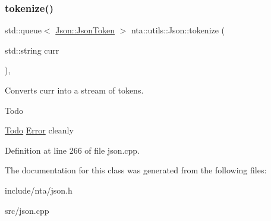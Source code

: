 \subsubsection{\texorpdfstring{tokenize()}{tokenize()}}
{\footnotesize\ttfamily std\+::queue$<$ \hyperlink{structnta_1_1utils_1_1Json_1_1JsonToken}{Json\+::\+Json\+Token} $>$ nta\+::utils\+::\+Json\+::tokenize (\begin{DoxyParamCaption}\item[{std\+::string}]{curr }\end{DoxyParamCaption})\hspace{0.3cm}{\ttfamily [static]}, {\ttfamily [private]}}



Converts curr into a stream of tokens. 

\begin{DoxyRefDesc}{Todo}
\item[\hyperlink{todo__todo000025}{Todo}]\hyperlink{structnta_1_1Error}{Error} cleanly \end{DoxyRefDesc}


Definition at line 266 of file json.\+cpp.



The documentation for this class was generated from the following files\+:\begin{DoxyCompactItemize}
\item 
include/nta/json.\+h\item 
src/json.\+cpp\end{DoxyCompactItemize}
